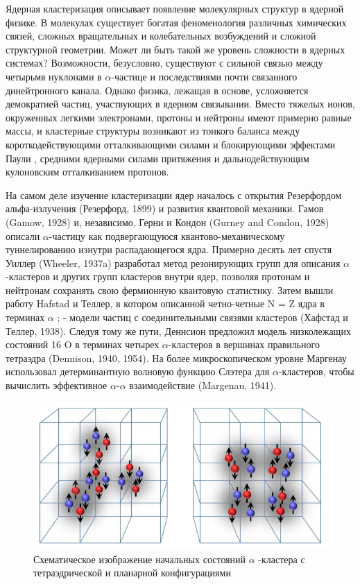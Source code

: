 \documentclass[fontsize=14pt]{scrarticle}
\begin{document}
Ядерная кластеризация описывает появление молекулярных структур в ядерной физике. В молекулах существует богатая феноменология различных химических связей, сложных вращательных и колебательных возбуждений и сложной структурной геометрии. Может ли быть такой же уровень сложности в ядерных системах? Возможности, безусловно, существуют с сильной связью между четырьмя нуклонами в $\alpha$-частице и последствиями почти связанного динейтронного канала. Однако физика, лежащая в основе, усложняется демократией частиц, участвующих в ядерном связывании. Вместо тяжелых ионов, окруженных легкими электронами, протоны и нейтроны имеют примерно равные массы, и кластерные структуры возникают из тонкого баланса между короткодействующими отталкивающими силами и блокирующими эффектами Паули , средними ядерными силами притяжения и дальнодействующим кулоновским отталкиванием протонов. 
	
На самом деле изучение кластеризации ядер началось с открытия Резерфордом альфа-излучения (Резерфорд, 1899) и развития квантовой механики. Гамов (Gamow, 1928) и, независимо, Герни и Кондон (Gurney and Condon, 1928) описали $\alpha$-частицу как подвергающуюся квантово-механическому туннелированию изнутри распадающегося ядра. Примерно десять лет спустя Уиллер (Wheeler, 1937a) разработал метод резонирующих групп для описания $\alpha$-кластеров и других групп кластеров внутри ядер, позволяя протонам и нейтронам сохранять свою фермионную квантовую статистику. Затем вышли работу Hafstad и Теллер, в котором описанной четно-четные N = Z ядра в терминах  $\alpha$ ; - модели частиц с соединительными связями кластеров (Хафстад и Теллер, 1938). Следуя тому же пути, Деннсион предложил модель низколежащих состояний 16 O в терминах четырех $\alpha$-кластеров в вершинах правильного тетраэдра (Dennison, 1940, 1954). На более микроскопическом уровне Маргенау использовал детерминантную волновую функцию Слэтера для $\alpha$-кластеров, чтобы вычислить эффективное $\alpha$-$\alpha$ взаимодействие (Margenau, 1941). 

\begin{figure}[!ht]
    \centerline{\includegraphics[scale=.7]{Picture13.png}}
    \caption{Схематическое изображение начальных состояний $\alpha$ -кластера с тетраэдрической и планарной конфигурациями}
    \label{fig14}
\end{figure}
\end{document}
